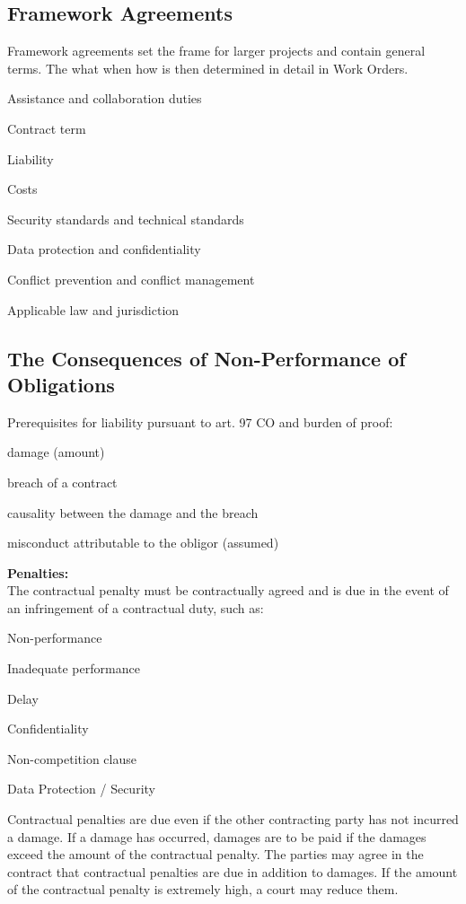 \subsection{Framework Agreements}
Framework agreements set the frame for larger projects and contain general terms. The what when how is then determined in detail in Work Orders.
\begin{compactenum}
	\item Assistance and collaboration duties
	\item Contract term
	\item Liability
	\item Costs
	\item Security standards and technical standards
	\item Data protection and confidentiality
	\item Conflict prevention and conflict management
	\item Applicable law and jurisdiction
\end{compactenum}

\subsection{The Consequences of Non-Performance of Obligations}
Prerequisites for liability pursuant to art. 97 CO and burden of proof:
\begin{compactitem}
	\item damage (amount)
	\item breach of a contract
	\item causality between the damage and the breach
	\item misconduct attributable to the obligor (assumed)
\end{compactitem}
\textbf{Penalties:}\\
The contractual penalty must be contractually agreed and is due in the event of an infringement of a contractual duty, such as:
\begin{compactitem}
	\item Non-performance
	\item Inadequate performance
	\item Delay
	\item Confidentiality
	\item Non-competition clause
	\item Data Protection / Security
\end{compactitem}
Contractual penalties are due even if the other contracting party has not incurred a damage. If a damage has occurred, damages are to be paid if the damages exceed the amount of the contractual penalty. The parties may agree in the contract that contractual penalties are due in addition to damages. If the amount of the contractual penalty is extremely high, a court may reduce them.

